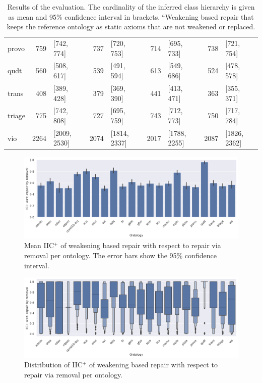 \begin{table}[ht]
\begin{tabular}{|l|r@{ }lr@{ }lr@{ }lr@{ }l|}
    provo & 759 & [742, 774] & 737 & [720, 753] & 714 & [695, 733] & 738 & [721, 754] \\
    qudt & 560 & [508, 617] & 539 & [491, 594] & 613 & [549, 686] & 524 & [478, 578] \\
    trans & 408 & [389, 428] & 379 & [369, 390] & 441 & [413, 471] & 363 & [355, 371] \\
    triage & 775 & [742, 808] & 727 & [695, 759] & 743 & [712, 773] & 750 & [717, 784] \\
    vio & 2264 & [2009, 2530] & 2074 & [1814, 2337] & 2017 & [1788, 2255] & 2087 & [1826, 2362] \\
    \hline
  \end{tabular}
  \caption{Results of the evaluation. The cardinality of the inferred class hierarchy is given as mean and 95\% confidence interval in brackets. $^a$Weakening based repair that keeps the reference ontology as static axioms that are not weakened or replaced.}
\end{table}

\begin{figure}[ht]
  \centering
  \includegraphics[width=\textwidth]{resources/eiic-remove-ontology-bar.png}
  \caption{Mean IIC$^+$ of weakening based repair with respect to repair via removal per ontology. The error bars show the 95\% confidence interval.}
\end{figure}

\begin{figure}[ht]
  \centering
  \includegraphics[width=\textwidth]{resources/eiic-remove-ontology-violin.png}
  \caption{Distribution of IIC$^+$ of weakening based repair with respect to repair via removal per ontology.}
\end{figure}

